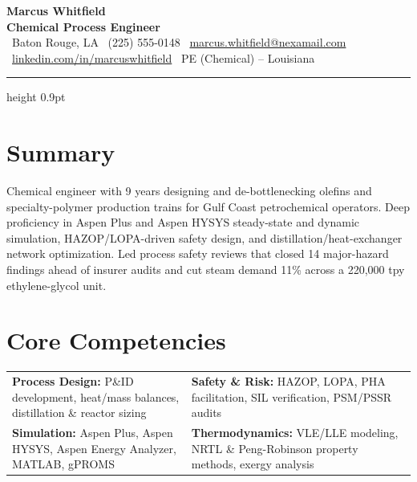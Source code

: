 \documentclass[10.5pt,letterpaper]{article}
\newcommand{\skillcat}[2]{%
  {\small\textbf{\color{primary}#1: }\color{graytext}#2}\par\vspace{3pt}
}
\begin{document}
\begin{center}
  {\fontsize{24}{26}\selectfont\bfseries\color{primary} Marcus Whitfield}\\[3pt]
  {\normalsize\color{accent}\bfseries Chemical Process Engineer}\\[5pt]
  {\small\color{graytext}
    \faMapMarker\ Baton Rouge, LA \quad
    \faPhone\ (225) 555-0148 \quad
    \faEnvelope\ \href{mailto:marcus.whitfield@nexamail.com}{marcus.whitfield@nexamail.com} \quad
    \faLinkedin\ \href{https://linkedin.com/in/marcuswhitfield}{linkedin.com/in/marcuswhitfield} \quad
    \faFile\ PE (Chemical) -- Louisiana
  }
\end{center}
\vspace{-8pt}
{\color{rulegray}\hrule height 0.9pt}
\vspace{2pt}

\section*{\textcolor{primary}{Summary}}
\vspace{-11pt}
{\color{rulegray}\titlerule[0.9pt]}
\vspace{4pt}
\small
Chemical engineer with 9 years designing and de-bottlenecking olefins and specialty-polymer
production trains for Gulf Coast petrochemical operators. Deep proficiency in Aspen Plus and
Aspen HYSYS steady-state and dynamic simulation, HAZOP/LOPA-driven safety design, and
distillation/heat-exchanger network optimization. Led process safety reviews that closed
14 major-hazard findings ahead of insurer audits and cut steam demand 11\% across a 220{,}000
tpy ethylene-glycol unit.

\section*{\textcolor{primary}{Core Competencies}}
\vspace{-11pt}
{\color{rulegray}\titlerule[0.9pt]}
\vspace{4pt}
\begin{tabularx}{\linewidth}{@{}X X@{}}
\skillcat{Process Design}{P\&ID development, heat/mass balances, distillation \& reactor sizing} &
\skillcat{Safety \& Risk}{HAZOP, LOPA, PHA facilitation, SIL verification, PSM/PSSR audits} \\
\skillcat{Simulation}{Aspen Plus, Aspen HYSYS, Aspen Energy Analyzer, MATLAB, gPROMS} &
\skillcat{Thermodynamics}{VLE/LLE modeling, NRTL \& Peng-Robinson property methods, exergy analysis} \\
\end{tabularx}
\end{document}
